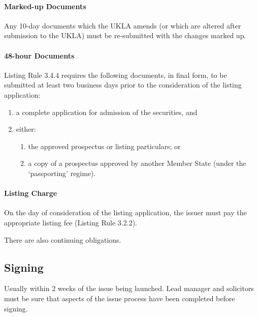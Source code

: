 \documentclass[
]{article}
\providecommand{\tightlist}{%
  \setlength{\itemsep}{0pt}\setlength{\parskip}{0pt}}
\begin{document}
\hypertarget{marked-up-documents}{%
\paragraph{Marked-up Documents}\label{marked-up-documents}}

Any 10-day documents which the UKLA amends (or which are altered after
submission to the UKLA) must be re-submitted with the changes marked up.

\hypertarget{hour-documents}{%
\paragraph{48-hour Documents}\label{hour-documents}}

Listing Rule 3.4.4 requires the following documents, in final form, to
be submitted at least two business days prior to the consideration of
the listing application:

\begin{enumerate}
\def\labelenumi{\arabic{enumi}.}
\tightlist
\item
  a complete application for admission of the securities, and
\item
  either:

  \begin{enumerate}
  \def\labelenumii{\arabic{enumii}.}
  \tightlist
  \item
    the approved prospectus or listing particulars; or
  \item
    a copy of a prospectus approved by another Member State (under the
    `passporting' regime).
  \end{enumerate}
\end{enumerate}

\hypertarget{listing-charge}{%
\paragraph{Listing Charge}\label{listing-charge}}

On the day of consideration of the listing application, the issuer must
pay the appropriate listing fee (Listing Rule 3.2.2).

There are also continuing obligations.

\hypertarget{signing}{%
\subsection{Signing}\label{signing}}

Usually within 2 weeks of the issue being launched. Lead manager and
solicitors must be sure that aspects of the issue process have been
completed before signing.
\end{document}
